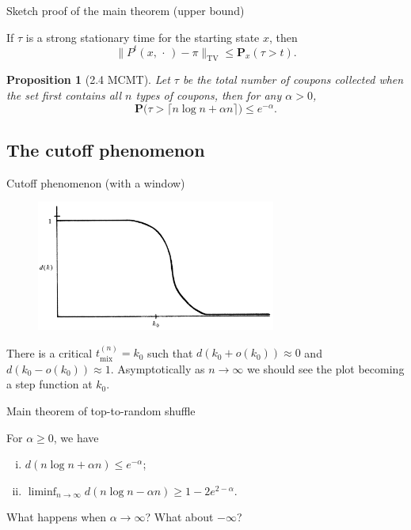 \documentclass[10pt]{beamer}
\newcommand{\blank}{\,\cdot\,}
\newcommand{\nm}[1]{\lVert #1 \rVert_\mathrm{TV}}
\newcommand{\tmix}{t_\mathrm{mix}}
\renewcommand{\Pr}{\mathbf{P}}
\newtheorem{prop}[theorem]{Proposition}
\begin{document}
\begin{frame}{Sketch proof of the main theorem (upper bound)}
    \begin{theorem}[6.11 MCMT]
        If $\tau$ is a strong stationary time for the starting state $x$, then \[
            \nm{P^t(x,\blank) - \pi} \leq \Pr_x(\tau > t).
        \]
    \end{theorem}
    \begin{prop}[2.4 MCMT]
        Let $\tau$ be the total number of coupons collected when the set first contains all $n$ types of coupons, then for any $\alpha > 0$, \[\Pr\bigl(\tau > \lceil n\log n + \alpha n\rceil\bigr) \leq e^{-\alpha}.\]
    \end{prop}
\end{frame}

\subsection{The cutoff phenomenon}
\begin{frame}{Cutoff phenomenon (with a window)}
    \begin{figure}
        \includegraphics[width = 0.7\textwidth]{cutoff.png}
    \end{figure}
    There is a critical $\tmix^{(n)} = k_0$ such that $d(k_0 + o(k_0)) \approx 0$ and $d(k_0 - o(k_0)) \approx 1$. Asymptotically as $n\to \infty$ we should see the plot becoming a step function at $k_0$.
\end{frame}

\begin{frame}{Main theorem of top-to-random shuffle}
    \begin{theorem}
    For $\alpha \geq 0$, we have 
        \begin{enumerate}[(i)]
            \item $d(n\log n+ \alpha n) \leq e^{-\alpha}$;
            \item %
            $\liminf_{n\to\infty} d(n\log n - \alpha n) \geq 1 - 2 e^{2-\alpha}$.
        \end{enumerate}
    \end{theorem}
    What happens when $\alpha \to \infty$? What about $-\infty$? %
\end{frame}
\end{document}

